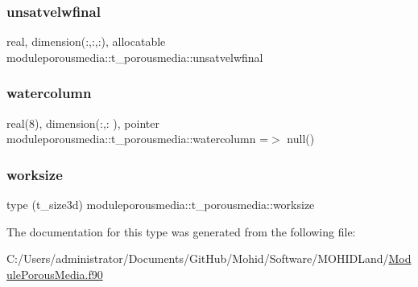 \subsubsection{\texorpdfstring{unsatvelwfinal}{unsatvelwfinal}}
{\footnotesize\ttfamily real, dimension(\+:,\+:,\+:), allocatable moduleporousmedia\+::t\+\_\+porousmedia\+::unsatvelwfinal\hspace{0.3cm}{\ttfamily [private]}}

\mbox{\label{structmoduleporousmedia_1_1t__porousmedia_adb08d811e5e863737632ba11c3106b10}} 
\subsubsection{\texorpdfstring{watercolumn}{watercolumn}}
{\footnotesize\ttfamily real(8), dimension(\+:,\+:  ), pointer moduleporousmedia\+::t\+\_\+porousmedia\+::watercolumn =$>$ null()\hspace{0.3cm}{\ttfamily [private]}}

\mbox{\label{structmoduleporousmedia_1_1t__porousmedia_ac813303deb15422be712de3388306b14}} 
\subsubsection{\texorpdfstring{worksize}{worksize}}
{\footnotesize\ttfamily type (t\+\_\+size3d) moduleporousmedia\+::t\+\_\+porousmedia\+::worksize\hspace{0.3cm}{\ttfamily [private]}}



The documentation for this type was generated from the following file\+:\begin{DoxyCompactItemize}
\item 
C\+:/\+Users/administrator/\+Documents/\+Git\+Hub/\+Mohid/\+Software/\+M\+O\+H\+I\+D\+Land/\mbox{\hyperlink{_module_porous_media_8f90}{Module\+Porous\+Media.\+f90}}\end{DoxyCompactItemize}
